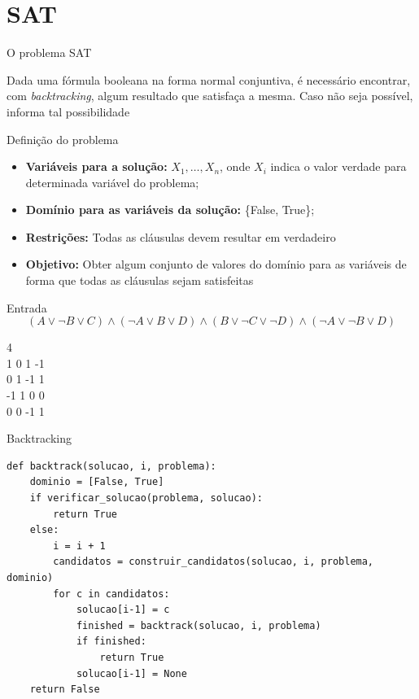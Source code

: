 \documentclass[compress,aspectratio=169]{beamer}
\begin{document}
\section{SAT}
    \begin{frame}{O problema SAT}
        \begin{justify}
            Dada uma fórmula booleana na forma normal conjuntiva, é necessário encontrar, com \textit{backtracking}, algum resultado que satisfaça a mesma. 
            Caso não seja possível, informa tal possibilidade
        \end{justify}
    \end{frame}
    \begin{frame}{Definição do problema}
        \begin{itemize}
            \item \textbf{Variáveis para a solução:} \(X_1, \dots, X_n\), onde \(X_i\) indica o valor verdade para determinada variável do problema;
            \item \textbf{Domínio para as variáveis da solução:} \{False, True\};
            \item \textbf{Restrições:} Todas as cláusulas devem resultar em verdadeiro
            \item \textbf{Objetivo:} Obter algum conjunto de valores do domínio para as variáveis de forma que todas as cláusulas sejam satisfeitas
        \end{itemize}
    \end{frame}
    \begin{frame}{Entrada}
        \[(A \lor \neg B \lor C) \land (\neg A \lor B \lor D) \land (B \lor \neg C \lor \neg D) \land (\neg A \lor \neg B \lor D)\]
        \begin{tcolorbox}[title=Arquivo de entrada para a fórmula, width=\linewidth, fontupper=\ttfamily, halign=flush left]
            4 \\
            1 0 1 -1 \\
            0 1 -1 1 \\
            -1 1 0 0 \\
            0 0 -1 1
        \end{tcolorbox}
    \end{frame}

    \begin{frame}[fragile]{Backtracking}
        \begin{lstlisting}
def backtrack(solucao, i, problema):
    dominio = [False, True]
    if verificar_solucao(problema, solucao):
        return True
    else:
        i = i + 1
        candidatos = construir_candidatos(solucao, i, problema, dominio)
        for c in candidatos:
            solucao[i-1] = c
            finished = backtrack(solucao, i, problema)
            if finished:
                return True
            solucao[i-1] = None
    return False
        \end{lstlisting}
    \end{frame}
\end{document}
